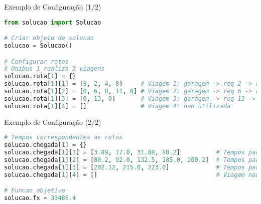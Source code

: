 \documentclass[10pt]{beamer}
\begin{document}
\begin{frame}[fragile]{Exemplo de Configuração (1/2)}
    \begin{lstlisting}[language=Python]
from solucao import Solucao

# Criar objeto de solucao
solucao = Solucao()

# Configurar rotas
# Onibus 1 realiza 3 viagens
solucao.rota[1] = {}
solucao.rota[1][1] = [0, 2, 4, 0]     # Viagem 1: garagem -> req 2 -> req 4 -> garagem
solucao.rota[1][2] = [0, 6, 8, 11, 0] # Viagem 2: garagem -> req 6 -> req 8 -> req 11 -> garagem
solucao.rota[1][3] = [0, 13, 0]       # Viagem 3: garagem -> req 13 -> garagem
solucao.rota[1][4] = []               # Viagem 4: nao utilizada
    \end{lstlisting}
\end{frame}

\begin{frame}[fragile]{Exemplo de Configuração (2/2)}
    \begin{lstlisting}[language=Python]
# Tempos correspondentes as rotas
solucao.chegada[1] = {}
solucao.chegada[1][1] = [3.89, 17.0, 31.08, 80.2]          # Tempos para rota[1][1]
solucao.chegada[1][2] = [80.2, 92.0, 132.5, 185.0, 200.2]  # Tempos para rota[1][2]
solucao.chegada[1][3] = [202.12, 215.0, 223.0]             # Tempos para rota[1][3]
solucao.chegada[1][4] = []                                 # Viagem nao utilizada

# Funcao objetivo
solucao.fx = 33486.4
    \end{lstlisting}
\end{frame}
\end{document}
